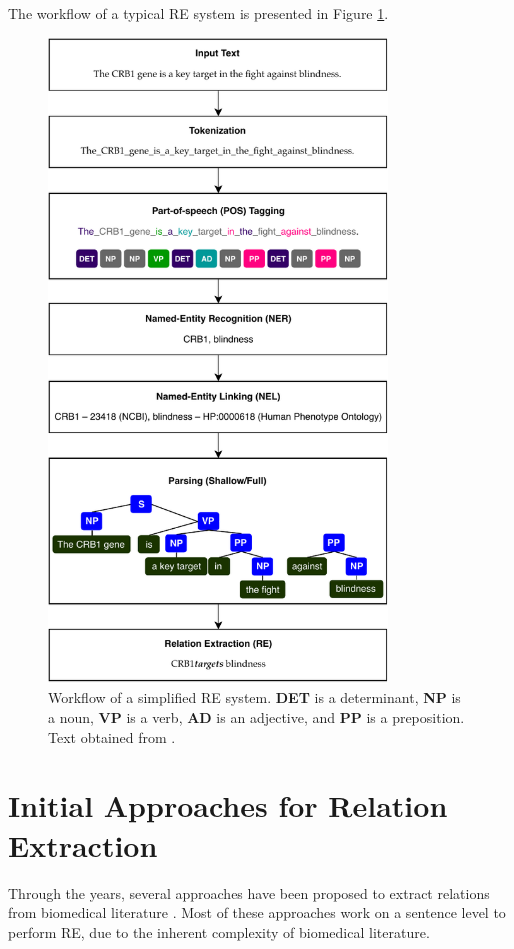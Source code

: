 The workflow of a typical RE system is presented in Figure \ref{figure:2}.

\begin{figure}[hbt!]
\captionsetup{font=small}
\centering
\includegraphics[width=9cm]{images/figure_2.pdf}
\fontsize{9}{10.8}\caption[Relation Extraction Workflow]{Workflow of a simplified RE system. \textbf{DET} is a determinant, \textbf{NP} is a noun, \textbf{VP} is a verb, \textbf{AD} is an adjective, and \textbf{PP} is a preposition. Text obtained from \cite{Alves2018}.}
\label{figure:2}
\end{figure}


\section{Initial Approaches for Relation Extraction}

Through the years, several approaches have been proposed to extract relations from biomedical literature \citep{10.1371/journal.pone.0171929}. Most of these approaches work on a sentence level to perform RE, due to the inherent complexity of biomedical literature.

